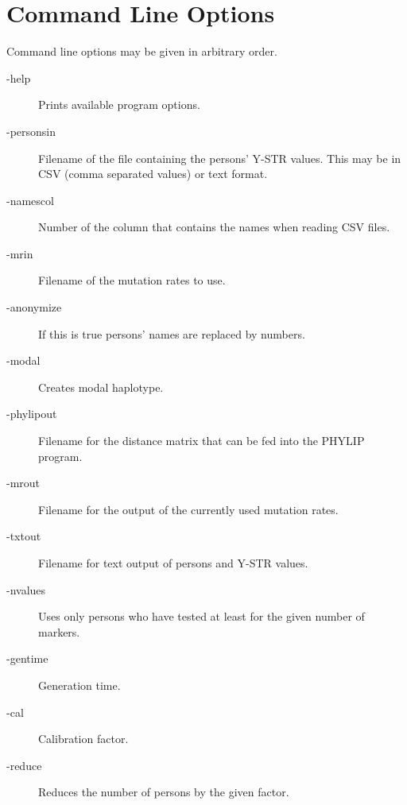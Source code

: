 \section{Command Line Options}

Command line options may be given in arbitrary order.

\begin{description}
\item[-help] Prints available program options.
\item[-personsin] Filename of the file containing the persons' Y-STR values.
	This may be in CSV (comma separated values) or text format.
\item[-namescol] Number of the column that contains the names
	when reading CSV files.
\item[-mrin] Filename of the mutation rates to use.
\item[-anonymize] If this is true persons' names are replaced by numbers.
\item[-modal] Creates modal haplotype.
\item[-phylipout] Filename for the distance matrix that can be fed into
	the PHYLIP\cite{Phylip} program.
\item[-mrout] Filename for the output of the currently used mutation rates.
\item[-txtout] Filename for text output of persons and Y-STR values.
\item[-nvalues] Uses only persons who have tested at least for the given number of markers.
\item[-gentime] Generation time.
\item[-cal] Calibration factor.
\item[-reduce] Reduces the number of persons by the given factor.
\end{description}

